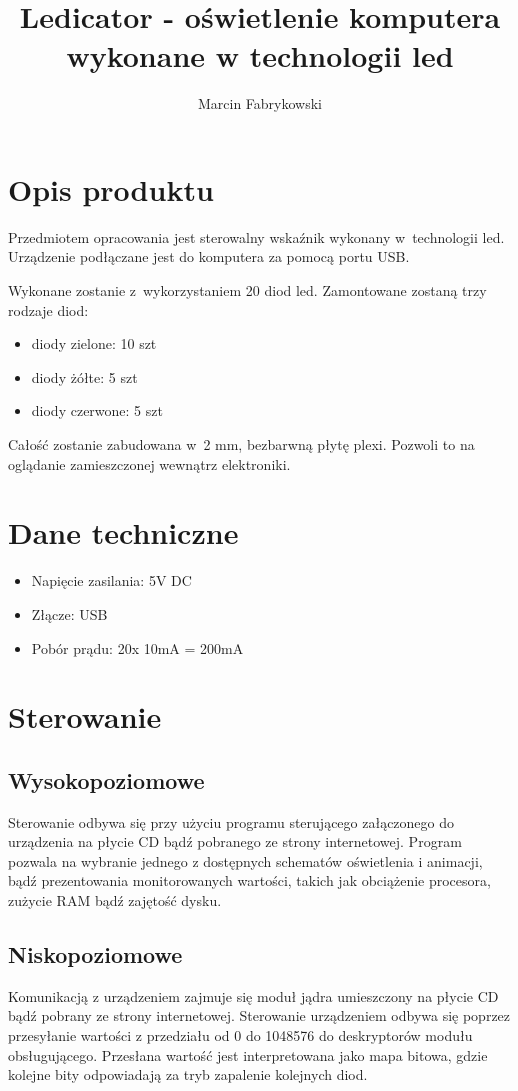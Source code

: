 \documentclass[a4paper,12pt]{article}
\author{Marcin Fabrykowski}
\title{Ledicator - oświetlenie komputera wykonane w technologii led}
\begin{document}
\maketitle
\newpage
\tableofcontents
\newpage

\section{Opis produktu}
	Przedmiotem opracowania jest sterowalny wskaźnik wykonany w~technologii led.
	Urządzenie podłączane jest do komputera za pomocą portu USB.
	
	Wykonane zostanie z~wykorzystaniem 20 diod led.
	Zamontowane zostaną trzy rodzaje diod:
	\begin{itemize}
		\item diody zielone: 10 szt
		\item diody żółte: 5 szt
		\item diody czerwone: 5 szt
	\end{itemize}
	
	Całość zostanie zabudowana w~2 mm, bezbarwną płytę plexi. Pozwoli to na oglądanie zamieszczonej wewnątrz elektroniki.

\section{Dane techniczne}
	\begin{itemize}
		\item Napięcie zasilania: 5V DC
		\item Złącze: USB
		\item Pobór prądu: 20x 10mA = 200mA
	\end{itemize}
\section{Sterowanie}
	\subsection{Wysokopoziomowe}
		Sterowanie odbywa się przy użyciu programu sterującego załączonego do urządzenia na płycie CD bądź pobranego ze strony internetowej.
		Program pozwala na wybranie jednego z dostępnych schematów oświetlenia i animacji, bądź prezentowania monitorowanych wartości, takich jak obciążenie procesora, zużycie RAM bądź zajętość dysku.
	\subsection{Niskopoziomowe}
		Komunikacją z urządzeniem zajmuje się moduł jądra umieszczony na płycie CD bądź pobrany ze strony internetowej.	
		Sterowanie urządzeniem odbywa się poprzez przesyłanie wartości z przedziału od 0 do 1048576 do deskryptorów modułu obsługującego.
		Przesłana wartość jest interpretowana jako mapa bitowa, gdzie kolejne bity odpowiadają za tryb zapalenie kolejnych diod.
\end{document}
